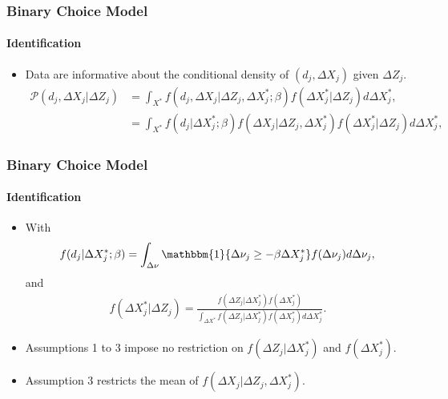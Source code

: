 \begin{frame}
\frametitle{Binary Choice Model}
\framesubtitle{Identification}

\begin{itemize}
	\item Data are informative about the conditional density of $(d_{j},\Delta X_{j})$ given $\Delta Z_{j}$. 
	\begin{align*}
	\mathcal{P}(d_{j},\Delta X_{j}|\Delta Z_{j})&=\int_{X^{*}}f(d_{j},\Delta X_{j}|\Delta Z_{j},\Delta X^{*}_{j};\beta)f(\Delta X^{*}_{j}|\Delta Z_{j})d\Delta X^{*}_{j},\\
	&=\int_{X^{*}}f(d_{j}|\Delta X^{*}_{j};\beta)f(\Delta X_{j}|\Delta Z_{j},\Delta X^{*}_{j})f(\Delta X^{*}_{j}|\Delta Z_{j})d\Delta X^{*}_{j},
	\end{align*}
\end{itemize}
\end{frame}

\begin{frame}
\frametitle{Binary Choice Model}
\framesubtitle{Identification}

\begin{itemize}
	\item With
	\begin{align*}
	f(d_{j}|\Delta X^{*}_{j};\beta)=\int_{\Delta\nu}\mathbbm{1}\{\Delta\nu_{j}\geq-\beta\Delta X^{*}_{j}\}f(\Delta\nu_{j})d\Delta\nu_{j},
	\end{align*}
	and
	\begin{align*}
	f(\Delta X^{*}_{j}|\Delta Z_{j})=\frac{f(\Delta Z_{j}|\Delta X^{*}_{j})f(\Delta X^{*}_{j})}{\int_{\Delta X^{*}}f(\Delta Z_{j}|\Delta X^{*}_{j})f(\Delta X^{*}_{j})d\Delta X^{*}_{j}}.
	\end{align*}
	\item Assumptions 1 to 3 impose no restriction on $f(\Delta Z_{j}|\Delta X^{*}_{j})$ and $f(\Delta X^{*}_{j})$.
	\item Assumption 3 restricts the mean of $f(\Delta X_{j}|\Delta Z_{j},\Delta X^{*}_{j})$.
\end{itemize}
\end{frame}


